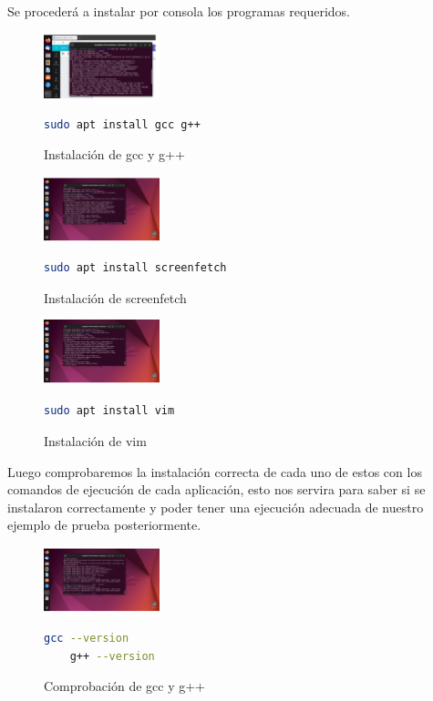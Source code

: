 \documentclass[journal]{IEEEtran}
\begin{document}
Se procederá a instalar por consola los programas requeridos.\\

\begin{figure}[htbp]
  \centering
  \includegraphics[width=0.3\textwidth]{Hyper-V/2.png}
  \caption{Instalación de gcc y g++}
  \begin{lstlisting}[language=bash]
    sudo apt install gcc g++
  \end{lstlisting}
\end{figure}

\begin{figure}[htbp]
  \centering
  \includegraphics[width=0.3\textwidth]{Hyper-V/3.png}
  \caption{Instalación de screenfetch}
  \begin{lstlisting}[language=bash]
    sudo apt install screenfetch
  \end{lstlisting}
\end{figure}

\begin{figure}[htbp]
  \centering
  \includegraphics[width=0.3\textwidth]{Hyper-V/4.png}
  \caption{Instalación de vim}
  \begin{lstlisting}[language=bash]
    sudo apt install vim
  \end{lstlisting}
\end{figure}

Luego comprobaremos la instalación correcta de cada uno de estos con los comandos de ejecución de cada aplicación, esto nos servira para saber si se instalaron correctamente y poder tener una ejecución adecuada de nuestro ejemplo de prueba posteriormente.

\begin{figure}[htbp]
  \centering
  \includegraphics[width=0.3\textwidth]{Hyper-V/5.png}
  \caption{Comprobación de gcc y g++}
  \begin{lstlisting}[language=bash]
    gcc --version
    g++ --version
   \end{lstlisting}
\end{figure}
\end{document}
